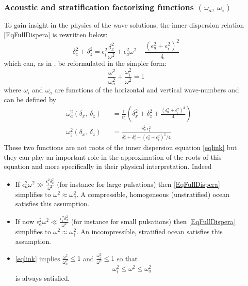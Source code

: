 \documentclass[a4paper,11pt]{article}
\begin{document}
\subsubsection{Acoustic and stratification factorizing functions $(\omega_a,\ \omega_i)$}
\label{subsubsectionFacto}
To gain insight in the physics of the wave solutions, the inner dispersion relation \ref{EqFullDispera} is rewritten below:
\begin{equation}
\delta_x^2+\delta_z^2 =\epsilon_i^2\frac{\delta_x^2}
{\omega^2}+\epsilon_a^2\omega^2-\frac{(\epsilon_a^2+\epsilon_i^2)^2}{4}
	\label{eqomegaparam2}
\end{equation}
which can, as in \cite{RevModPhys.35.207}, be reformulated in the simpler form:
\begin{equation}
	\frac{\omega^2}{\omega_a^2}+\frac{\omega_i^2}{\omega^2}=1
	\label{eqlink}
\end{equation}
where $\omega_i$ and $\omega_a$ are functions of the horizontal and vertical wave-numbers and can be defined by
\begin{subequations}
	\label{EqDispSols}
	\begin{alignat}{2}	
	\label{SolAcous}
	& \omega_a^2(\delta_x,\ \delta_z) &&=\frac{1}{\epsilon_a^2}\left(
	\delta_x^2+\delta_z^2
	+\frac{(\epsilon_a^2+\epsilon_i^2)^2}{4}
	\right)\\
	\label{SolGrav}
	&\omega_i^2(\delta_x,\ \delta_z)  &&=
	\frac{\delta_x^2\ \epsilon_i^2}{\delta_x^2+\delta_z^2
	+(\epsilon_a^2+\epsilon_i^2)^2/4}
	\end{alignat}
\end{subequations}
These two functions are not roots of the inner dispersion equation \ref{eqlink} but they can play an important role in the approximation of the roots of this equation and more specifically in their physical interpretation. Indeed
\begin{itemize}
	\item If
	$\epsilon_a^2\omega^2 \gg \frac{\epsilon_i^2\delta_x^2}{\omega^2}$ (for instance for large pulsations) then \ref{EqFullDispera} simplifies to 
	$\omega^2\approx\omega_a^2$. A compressible, homogeneous (unstratified) ocean satisfies this assumption.
	\item If now $\epsilon_a^2\omega^2 \ll \frac{\epsilon_i^2\delta_x^2}{\omega^2}$ (for instance for small pulsations) then \ref{EqFullDispera} simplifies to $\omega^2\approx\omega_i^2$. An incompressible, stratified ocean satisfies this assumption.
	\item \ref{eqlink} implies $\frac{\omega^2}{\omega_a^2}\le 1$ and $\frac{\omega_i^2}{\omega^2}\le 1$ so that
	\[
	\omega_i^2\le \omega^2 \le \omega_a^2
	\]
	is always satisfied.
\end{itemize}
\end{document}
